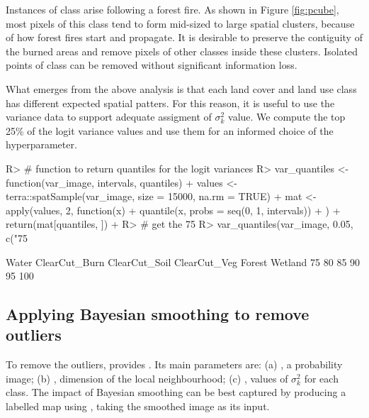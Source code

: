 \documentclass[
  shortnames]{jss}
\begin{document}
Instances of class  arise following a forest fire. As shown in Figure \ref{fig:pcube}, most pixels of this class tend to form mid-sized to large spatial clusters, because of how forest fires start and propagate. It is desirable to preserve the contiguity of the burned areas and remove pixels of other classes inside these clusters. Isolated points of class  can be removed without significant information loss.

What emerges from the above analysis is that each land cover and land use class has different expected spatial patters. For this reason, it is useful to use the variance data to support adequate assigment of \(\sigma^2_k\) value. We compute the top 25\% of the logit variance values and use them for an informed choice of the hyperparameter.

\begin{CodeChunk}
\begin{CodeInput}
R> # function to return quantiles for the logit variances
R> var_quantiles <- function(var_image, intervals, quantiles){
+   values <- terra::spatSample(var_image, size = 15000, na.rm = TRUE)
+   mat <- apply(values, 2, function(x){ 
+     quantile(x, probs = seq(0, 1, intervals))
+   })
+   return(mat[quantiles, ])
+ }
R> # get the 75%
R> var_quantiles(var_image, 0.05, c("75%
\end{CodeInput}
\begin{CodeOutput}
         Water ClearCut_Burn ClearCut_Soil ClearCut_Veg    Forest    Wetland
75%
80%
85%
90%
95%
100%
\end{CodeOutput}
\end{CodeChunk}

\subsection{Applying Bayesian smoothing to remove outliers}\label{applying-bayesian-smoothing-to-remove-outliers}

To remove the outliers,  provides . Its main parameters are: (a) , a probability image; (b) , dimension of the local neighbourhood; (c) , values of \(\sigma^2_{k}\) for each class. The impact of Bayesian smoothing can be best captured by producing a labelled map using , taking the smoothed image as its input.
\end{document}
